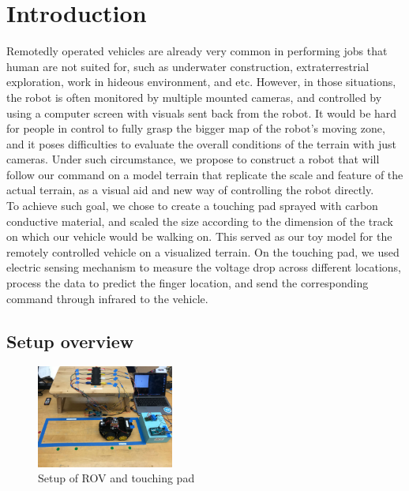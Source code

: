 \documentclass[reprint,amsmath, amsfonts, amssymb, aps, letterpaper]{revtex4-1}
\begin{document}
\maketitle

\section{Introduction}
Remotedly operated vehicles are already very common in performing jobs that human are not suited for, such as underwater construction, extraterrestrial exploration, work in hideous environment, and etc. However, in those situations, the robot is often monitored by multiple mounted cameras, and controlled by using a computer screen with visuals sent back from the robot. It would be hard for people in control to fully grasp the bigger map of the robot's moving zone, and it poses difficulties to evaluate the overall conditions of the terrain with just cameras. Under such circumstance, we propose to construct a robot that will follow our command on a model terrain that replicate the scale and feature of the actual terrain, as a visual aid and new way of controlling the robot directly.
\\\indent To achieve such goal, we chose to create a touching pad sprayed with carbon conductive material, and scaled the size according to the dimension of the track on which our vehicle would be walking on. This served as our toy model for the remotely controlled vehicle on a visualized terrain. On the touching pad, we used electric sensing mechanism to measure the voltage drop across different locations, process the data to predict the finger location, and send the corresponding command through infrared to the vehicle.

\subsection{Setup overview}
\begin{figure}[h]
\centering
    \includegraphics[width=0.4\textwidth]{./figure/setup}     
       \caption{Setup of ROV and touching pad }
    \label{fig::setup}
\end{figure}
\end{document}
